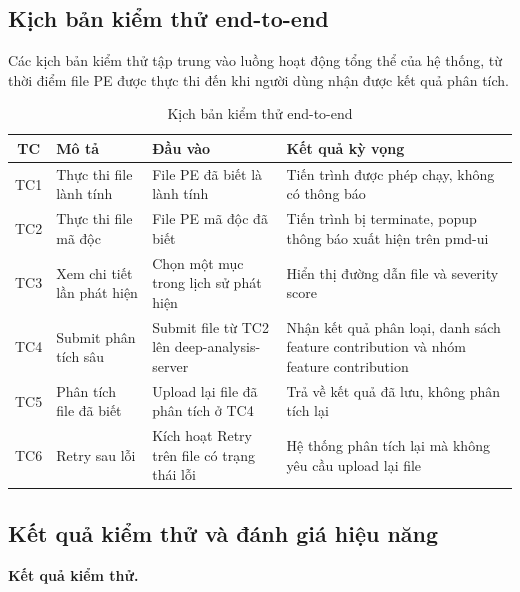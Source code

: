 \subsection{Kịch bản kiểm thử end-to-end}

Các kịch bản kiểm thử tập trung vào luồng hoạt động tổng thể của hệ
thống, từ thời điểm file PE được thực thi đến khi người dùng nhận
được kết quả phân tích.

\begin{table}[h]
\centering
\caption{Kịch bản kiểm thử end-to-end}
\label{tab:testcases}
\begin{tabular}{clp{4.5cm}p{4cm}}
\toprule
\textbf{TC} & \textbf{Mô tả} & \textbf{Đầu vào} &
\textbf{Kết quả kỳ vọng} \\
\midrule
TC1 & Thực thi file lành tính &
    File PE đã biết là lành tính &
    Tiến trình được phép chạy, không có thông báo \\
\midrule
TC2 & Thực thi file mã độc &
    File PE mã độc đã biết &
    Tiến trình bị terminate, popup thông báo xuất hiện trên pmd-ui \\
\midrule
TC3 & Xem chi tiết lần phát hiện &
    Chọn một mục trong lịch sử phát hiện &
    Hiển thị đường dẫn file và severity score \\
\midrule
TC4 & Submit phân tích sâu &
    Submit file từ TC2 lên deep-analysis-server &
    Nhận kết quả phân loại, danh sách feature contribution và nhóm
    feature contribution \\
\midrule
TC5 & Phân tích file đã biết &
    Upload lại file đã phân tích ở TC4 &
    Trả về kết quả đã lưu, không phân tích lại \\
\midrule
TC6 & Retry sau lỗi &
    Kích hoạt Retry trên file có trạng thái lỗi &
    Hệ thống phân tích lại mà không yêu cầu upload lại file \\
\bottomrule
\end{tabular}
\end{table}

\subsection{Kết quả kiểm thử và đánh giá hiệu năng}

\textbf{Kết quả kiểm thử.}


